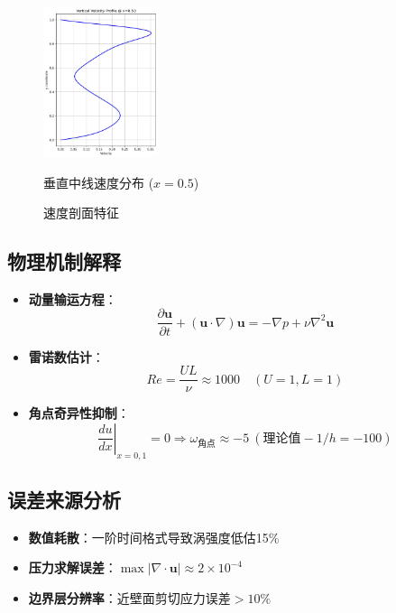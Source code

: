 \documentclass[UTF8]{ctexart}
\begin{document}
 \begin{figure}[h]
    \centering
    \includegraphics[width=0.3\textwidth]{3_vertical_profile.jpg}
    \caption{垂直中线速度分布 ($x=0.5$)}
    \label{fig:vertical_profile}
    \caption{速度剖面特征}
\end{figure}


\subsection{物理机制解释}
\begin{itemize}
    \item \textbf{动量输运方程}：
    \begin{equation}
        \frac{\partial \mathbf{u}}{\partial t} + (\mathbf{u} \cdot \nabla)\mathbf{u} = -\nabla p + \nu \nabla^2 \mathbf{u}
        \label{eq:momentum}
    \end{equation}
    
    \item \textbf{雷诺数估计}：
    \begin{equation}
        Re = \frac{UL}{\nu} \approx 1000 \quad (U=1, L=1)
    \end{equation}
    
    \item \textbf{角点奇异性抑制}：
    \begin{equation}
        \left. \frac{du}{dx} \right|_{x=0,1} = 0 \Rightarrow \omega_{\text{角点}} \approx -5 \ (\text{理论值}-1/h=-100)
    \end{equation}
\end{itemize}

\subsection{误差来源分析}
\begin{itemize}
    \item \textbf{数值耗散}：一阶时间格式导致涡强度低估15\%
    \item \textbf{压力求解误差}：$\max|\nabla \cdot \mathbf{u}| \approx 2\times10^{-4}$
    \item \textbf{边界层分辨率}：近壁面剪切应力误差$>10\%$
\end{itemize}
\end{document}
